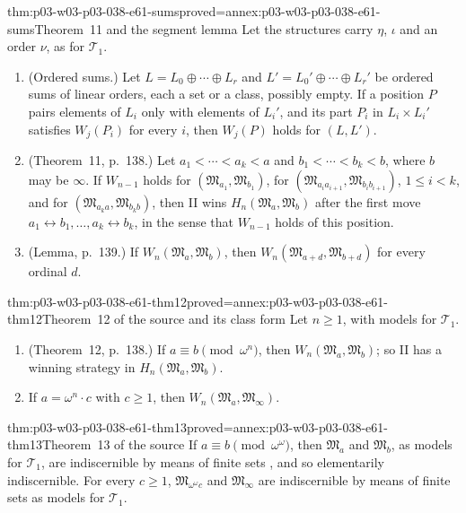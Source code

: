 \begin{hblemma}{thm:p03-w03-p03-038-e61-sums}{proved=annex:p03-w03-p03-038-e61-sums}{Theorem~11 and the segment lemma}
Let the structures carry \(\eta\), \(\iota\) and an order \(\nu\), as for
\(\mathcal T_1\).
\begin{enumerate}
\item (Ordered sums.) Let \(L=L_0\oplus\cdots\oplus L_r\) and
      \(L'=L_0'\oplus\cdots\oplus L_r'\) be ordered sums of linear orders,
      each a set or a class, possibly empty. If a position \(P\) pairs
      elements of \(L_i\) only with elements of \(L_i'\), and its part
      \(P_i\) in \(L_i\times L_i'\) satisfies \(W_j(P_i)\) for every
      \(i\), then \(W_j(P)\) holds for \((L,L')\).
\item (Theorem~11, p.~138.) Let \(a_1<\cdots<a_k<a\) and
      \(b_1<\cdots<b_k<b\), where \(b\) may be \(\infty\). If
      \(W_{n-1}\) holds for \((\mathfrak M_{a_1},\mathfrak M_{b_1})\), for
      \((\mathfrak M_{a_ia_{i+1}},\mathfrak M_{b_ib_{i+1}})\),
      \(1\le i<k\), and for \((\mathfrak M_{a_ka},\mathfrak M_{b_kb})\),
      then II wins \(H_n(\mathfrak M_a,\mathfrak M_b)\) after the first
      move \(a_1\leftrightarrow b_1,\ldots,a_k\leftrightarrow b_k\), in the
      sense that \(W_{n-1}\) holds of this position.
\item (Lemma, p.~139.) If \(W_n(\mathfrak M_a,\mathfrak M_b)\), then
      \(W_n(\mathfrak M_{a+d},\mathfrak M_{b+d})\) for every ordinal
      \(d\).
\end{enumerate}
\end{hblemma}

\begin{hbtheorem}{thm:p03-w03-p03-038-e61-thm12}{proved=annex:p03-w03-p03-038-e61-thm12}{Theorem~12 of the source and its class form}
Let \(n\ge1\), with models for \(\mathcal T_1\).
\begin{enumerate}
\item (Theorem~12, p.~138.) If \(a\equiv b\pmod{\omega^n}\), then
      \(W_n(\mathfrak M_a,\mathfrak M_b)\); so II has a winning strategy in
      \(H_n(\mathfrak M_a,\mathfrak M_b)\).
\item If \(a=\omega^n\cdot c\) with \(c\ge1\), then
      \(W_n(\mathfrak M_a,\mathfrak M_\infty)\).
\end{enumerate}
\end{hbtheorem}

\begin{hbtheorem}{thm:p03-w03-p03-038-e61-thm13}{proved=annex:p03-w03-p03-038-e61-thm13}{Theorem~13 of the source}
If \(a\equiv b\pmod{\omega^\omega}\), then \(\mathfrak M_a\) and
\(\mathfrak M_b\), as models for \(\mathcal T_1\), are indiscernible by
means of finite sets \cite[p.~139]{Ehrenfeucht1961}, and so elementarily
indiscernible. For every \(c\ge1\), \(\mathfrak M_{\omega^\omega c}\) and
\(\mathfrak M_\infty\) are indiscernible by means of finite sets as models
for \(\mathcal T_1\).
\end{hbtheorem}

